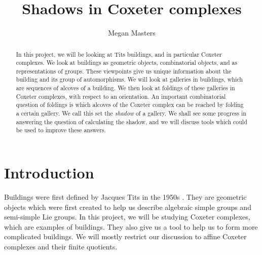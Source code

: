 \documentclass[11pt]{article}
\begin{document}
\newtheorem{theorem}{Theorem}
\theoremstyle{definition}
\newtheorem{definition}{Definition}
\newtheorem{proposition}{Proposition}
\newtheorem{example}{Example}
\newtheorem{lemma}{Lemma}
\newtheorem{corollary}{Corollary}
\newcommand{\uw}{\mathcal{U}(W,X)}
\newcommand{\W}{$(W,S)$}
\newcommand{\ix}{\textit}
\newcommand{\tr}{\textcolor{red}}
\newcommand{\sg}{$\Sigma$}


\title{Shadows in Coxeter complexes}
\author{Megan Masters}
\maketitle



\begin{abstract}

In this project, we will be looking at Tits buildings, and in particular Coxeter complexes. We look at buildings as geometric objects, combinatorial objects, and as representations of groups. These viewpoints give us unique information about the building and its group of automorphisms. We will look at galleries in buildings, which are sequences of alcoves of a building. We then look at foldings of these galleries in Coxeter complexes, with respect to an orientation. An important combinatorial question of foldings is which alcoves of the Coxeter complex can be reached by folding a certain gallery. We call this set the \ix{shadow} of a gallery. We shall see some progress in answering the question of calculating the shadow, and we will discuss tools which could be used to improve these answers. 

 \end{abstract}
\tableofcontents
\section{Introduction}
Buildings were first defined by Jacques Tits in the 1950s \cite{TITS}. They are geometric objects which were first created to help us describe algebraic simple groups and semi-simple Lie groups. In this project, we will be studying Coxeter complexes, which are examples of buildings. They also give us a tool to help us to form more complicated buildings. We will mostly restrict our discussion to affine Coxeter complexes and their finite quotients.
\end{document}
